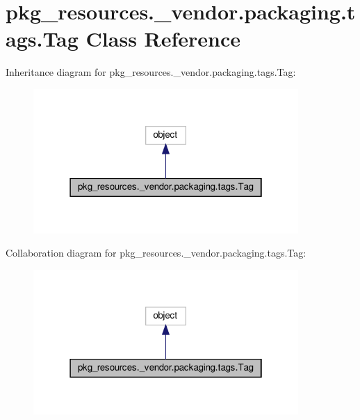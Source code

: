 \hypertarget{classpkg__resources_1_1__vendor_1_1packaging_1_1tags_1_1Tag}{}\section{pkg\+\_\+resources.\+\_\+vendor.\+packaging.\+tags.\+Tag Class Reference}
\label{classpkg__resources_1_1__vendor_1_1packaging_1_1tags_1_1Tag}


Inheritance diagram for pkg\+\_\+resources.\+\_\+vendor.\+packaging.\+tags.\+Tag\+:
\nopagebreak
\begin{figure}[H]
\begin{center}
\leavevmode
\includegraphics[width=286pt]{classpkg__resources_1_1__vendor_1_1packaging_1_1tags_1_1Tag__inherit__graph}
\end{center}
\end{figure}


Collaboration diagram for pkg\+\_\+resources.\+\_\+vendor.\+packaging.\+tags.\+Tag\+:
\nopagebreak
\begin{figure}[H]
\begin{center}
\leavevmode
\includegraphics[width=286pt]{classpkg__resources_1_1__vendor_1_1packaging_1_1tags_1_1Tag__coll__graph}
\end{center}
\end{figure}
